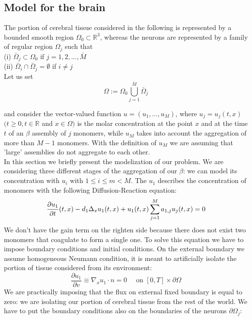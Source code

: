 \subsection{Model for the brain}
The portion of cerebral tissue considered  in the following is represented by a bounded smooth region $\Omega_{0}\subset \mathbb{R}^3$, whereas the neurons are represented by a family of regular region $\Omega_{j}$ such that \\
(i) $\bar\Omega_{j}\subset \Omega_{0}$  if   $j=1,2,\dots,\bar{M}$\\
(ii) $\bar\Omega_{i}\cap \bar\Omega_{j}= \emptyset$  if $i\neq j$\\
Let us set 
$$
\Omega := \Omega_{0}
\bigcup_{j=1}^{\bar M} \bar\Omega_{j}
$$
\begin{figure}[H]
    \label{fig:riemmans-theorem}
  \end{figure}
and consider the vector-valued function $u=(u_1,\dots, u_M)$, where $u_j=u_j(t,x)$ $(t\geq 0, t\in \mathbb{R}$ and $x\in \Omega)$ is the molar concentration at the point $x$ and at the time $t$ of an \(\beta\) assembly of $j$ monomers, while $u_M$ takes into account the aggregation of more than $M-1$ monomers. With the definition of $u_M$ we are assuming that 'large' assemblies do not aggregate to each other.\\
In this section we briefly present the modelization of our problem. We are considering three different stages of the aggregation of our \(\beta\): we can model its concentration with $u_{i}$ with $1\leq i \leq m < M$.
The $u_{1}$ describes the concentration of monomers with the following Diffusion-Reaction equation: 
$$
\frac{\partial u_{1}}{\partial t}(t, x)-d_{1} \Delta_{x} u_{1}(t, x)+u_{1}(t, x) \sum_{j=1}^{M} a_{1, j} u_{j}(t, x)=0\\
$$
We don't have the gain term on the righten side because there does not exist two monomers that coagulate to form a single one.
To solve this equation we have to impose boundary conditions and initial conditions.
On the external boundary we assume homogeneous Neumann condition, it is meant to artificially isolate the portion of tissue considered from its environment:
$$
\frac{\partial u_1}{\partial v} \equiv \nabla_{x} u_1\cdot n=0 \quad \text { on }[0, T] \times \partial \Omega$$
We are practically imposing that the flux on external fixed boundary is equal to zero: we are isolating our portion of cerebral tissue from the rest of the world.
We have to put the boundary conditions also on the boundaries of the neurons $\partial\Omega_{j}$:
